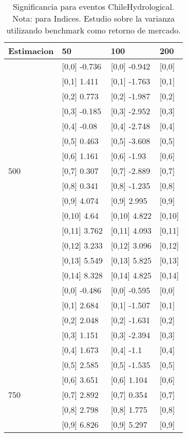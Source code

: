 \begin{table}

\caption{Significancia para eventos ChileHydrological. Nota: para Indices. Estudio sobre la varianza utilizando benchmark como retorno de mercado.}
\centering
\begin{tabular}[t]{llll}
\toprule
Estimacion & 50 & 100 & 200\\
\midrule
 & {}[0,0] -0.736 & {}[0,0] -0.942 & {}[0,0]\\
 & {}[0,1] 1.411 & {}[0,1] -1.763 & {}[0,1]\\
 & {}[0,2] 0.773 & {}[0,2] -1.987 & {}[0,2]\\
 & {}[0,3] -0.185 & {}[0,3] -2.952 & {}[0,3]\\
 & {}[0,4] -0.08 & {}[0,4] -2.748 & {}[0,4]\\
\addlinespace
 & {}[0,5] 0.463 & {}[0,5] -3.608 & {}[0,5]\\
 & {}[0,6] 1.161 & {}[0,6] -1.93 & {}[0,6]\\
500 & {}[0,7] 0.307 & {}[0,7] -2.889 & {}[0,7]\\
 & {}[0,8] 0.341 & {}[0,8] -1.235 & {}[0,8]\\
 & {}[0,9] 4.074 & {}[0,9] 2.995 & {}[0,9]\\
\addlinespace
 & {}[0,10] 4.64 & {}[0,10] 4.822 & {}[0,10]\\
 & {}[0,11] 3.762 & {}[0,11] 4.093 & {}[0,11]\\
 & {}[0,12] 3.233 & {}[0,12] 3.096 & {}[0,12]\\
 & {}[0,13] 5.549 & {}[0,13] 5.825 & {}[0,13]\\
 & {}[0,14] 8.328 & {}[0,14] 4.825 & {}[0,14]\\
\addlinespace
 & {}[0,0] -0.486 & {}[0,0] -0.595 & {}[0,0]\\
 & {}[0,1] 2.684 & {}[0,1] -1.507 & {}[0,1]\\
 & {}[0,2] 2.048 & {}[0,2] -1.631 & {}[0,2]\\
 & {}[0,3] 1.151 & {}[0,3] -2.394 & {}[0,3]\\
 & {}[0,4] 1.673 & {}[0,4] -1.1 & {}[0,4]\\
\addlinespace
 & {}[0,5] 2.585 & {}[0,5] -1.535 & {}[0,5]\\
 & {}[0,6] 3.651 & {}[0,6] 1.104 & {}[0,6]\\
750 & {}[0,7] 2.892 & {}[0,7] 0.354 & {}[0,7]\\
 & {}[0,8] 2.798 & {}[0,8] 1.775 & {}[0,8]\\
 & {}[0,9] 6.826 & {}[0,9] 5.297 & {}[0,9]\\

\end{tabular}
\end{table}
